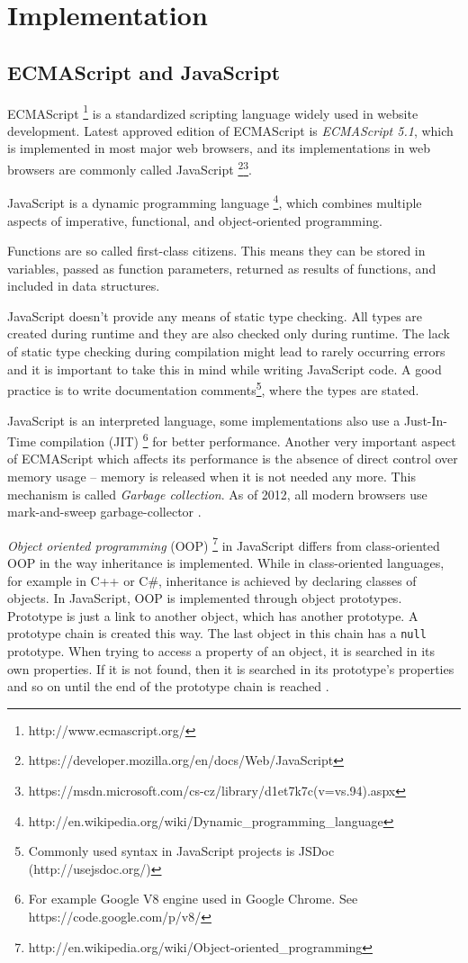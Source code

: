 \chapter{Implementation}



\section{ECMAScript and JavaScript}
ECMAScript \footnote{http://www.ecmascript.org/} is a standardized scripting language widely used in website development. Latest approved edition of ECMAScript is \textit{ECMAScript 5.1}, which is implemented in most major web browsers, and its implementations in web browsers are commonly called JavaScript \footnote{https://developer.mozilla.org/en/docs/Web/JavaScript}\footnote{https://msdn.microsoft.com/cs-cz/library/d1et7k7c(v=vs.94).aspx}. 

JavaScript is a dynamic programming language \footnote{http://en.wikipedia.org/wiki/Dynamic\_programming\_language}, which combines multiple aspects of imperative, functional, and object-oriented programming.

Functions are so called first-class citizens. This means they can be stored in variables, passed as function parameters, returned as results of functions, and included in data structures.

JavaScript doesn't provide any means of static type checking. All types are created during runtime and they are also checked only during runtime. The lack of static type checking during compilation might lead to rarely occurring errors and it is important to take this in mind while writing JavaScript code. A good practice is to write documentation comments\footnote{Commonly used syntax in JavaScript projects is JSDoc (http://usejsdoc.org/)}, where the types are stated.

JavaScript is an interpreted language, some implementations also use a Just-In-Time compilation (JIT) \footnote{For example Google V8 engine used in Google Chrome. See https://code.google.com/p/v8/} for better performance.  Another very important aspect of ECMAScript which affects its performance is the absence of direct control over memory usage -- memory is released when it is not needed any more. This mechanism is called \textit{Garbage collection}. As of 2012, all modern browsers use mark-and-sweep garbage-collector \cite{mdn_memmory_management}.

\textit{Object oriented programming} (OOP) \footnote{http://en.wikipedia.org/wiki/Object-oriented\_programming} in JavaScript differs from class-oriented OOP in the way inheritance is implemented. While in class-oriented languages, for example in C++ or C\#, inheritance is achieved by declaring classes of objects. In JavaScript, OOP is implemented through object prototypes. Prototype is just a link to another object, which has another prototype. A prototype chain is created this way. The last object in this chain has a \verb|null| prototype. When trying to access a property of an object, it is searched in its own properties. If it is not found, then it is searched in its prototype's properties and so on until the end of the prototype chain is reached \cite{mdn_prototype_chain}.

